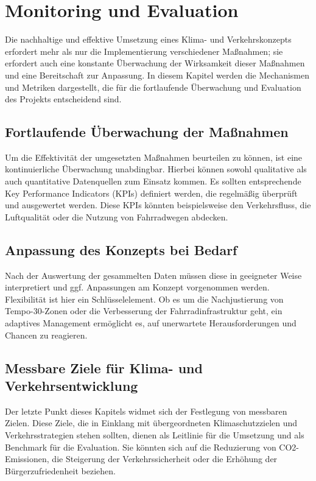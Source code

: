 \section{Monitoring und Evaluation}
Die nachhaltige und effektive Umsetzung eines Klima- und Verkehrskonzepts erfordert mehr als nur die Implementierung verschiedener Maßnahmen; sie erfordert auch eine konstante Überwachung der Wirksamkeit dieser Maßnahmen und eine Bereitschaft zur Anpassung. In diesem Kapitel werden die Mechanismen und Metriken dargestellt, die für die fortlaufende Überwachung und Evaluation des Projekts entscheidend sind.
\subsection{Fortlaufende Überwachung der Maßnahmen}
Um die Effektivität der umgesetzten Maßnahmen beurteilen zu können, ist eine kontinuierliche Überwachung unabdingbar. Hierbei können sowohl qualitative als auch quantitative Datenquellen zum Einsatz kommen. Es sollten entsprechende Key Performance Indicators (KPIs) definiert werden, die regelmäßig überprüft und ausgewertet werden. Diese KPIs könnten beispielsweise den Verkehrsfluss, die Luftqualität oder die Nutzung von Fahrradwegen abdecken.
\subsection{Anpassung des Konzepts bei Bedarf}
Nach der Auswertung der gesammelten Daten müssen diese in geeigneter Weise interpretiert und ggf. Anpassungen am Konzept vorgenommen werden. Flexibilität ist hier ein Schlüsselelement. Ob es um die Nachjustierung von Tempo-30-Zonen oder die Verbesserung der Fahrradinfrastruktur geht, ein adaptives Management ermöglicht es, auf unerwartete Herausforderungen und Chancen zu reagieren.
\subsection{Messbare Ziele für Klima- und Verkehrsentwicklung}

Der letzte Punkt dieses Kapitels widmet sich der Festlegung von messbaren Zielen. Diese Ziele, die in Einklang mit übergeordneten Klimaschutzzielen und Verkehrsstrategien stehen sollten, dienen als Leitlinie für die Umsetzung und als Benchmark für die Evaluation. Sie könnten sich auf die Reduzierung von CO2-Emissionen, die Steigerung der Verkehrssicherheit oder die Erhöhung der Bürgerzufriedenheit beziehen.